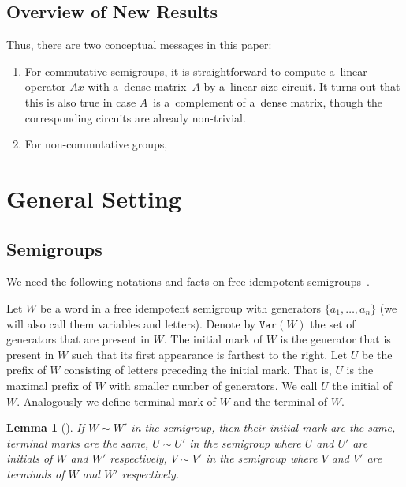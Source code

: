\documentclass[11pt,letterpaper]{article}
\newtheorem{lemma}{Lemma}
\newcommand{\var}{\texttt{Var}}
\begin{document}

\subsection{Overview of New Results}

Thus, there are two conceptual messages in this paper:
\begin{enumerate}
\item For commutative semigroups, it is straightforward to compute a~linear operator $Ax$ with a~dense matrix~$A$ by a~linear size circuit. It turns out that this is also true in case $A$~is a~complement of a~dense matrix, though the corresponding circuits are already non-trivial.
\item For non-commutative groups,
\end{enumerate}

\section{General Setting}
\subsection{Semigroups}

We need the following notations and facts on free idempotent semigroups~\cite{GreenR52}.

Let $W$ be a word in a free idempotent semigroup with generators $\{a_1,\ldots, a_n\}$ (we will also call them variables and letters). Denote by $\var(W)$ the set of generators that are present in $W$. The initial mark of $W$ is the generator that is present in $W$ such that its first appearance is farthest to the right. Let $U$ be the prefix of $W$ consisting of letters preceding the initial mark. That is, $U$ is the maximal prefix of $W$ with smaller number of generators. We call $U$ the initial of $W$. Analogously we define terminal mark of $W$ and the terminal of $W$.

\begin{lemma}[\cite{GreenR52}] \label{lem:GR}
If $W\sim W'$ in the semigroup, then their initial mark are the same, terminal marks are the same, $U \sim U'$ in the semigroup where $U$ and $U'$ are initials of $W$ and $W'$ respectively, $V\sim V'$ in the semigroup where $V$ and $V'$ are terminals of $W$ and $W'$ respectively.
\end{lemma}
\end{document}
